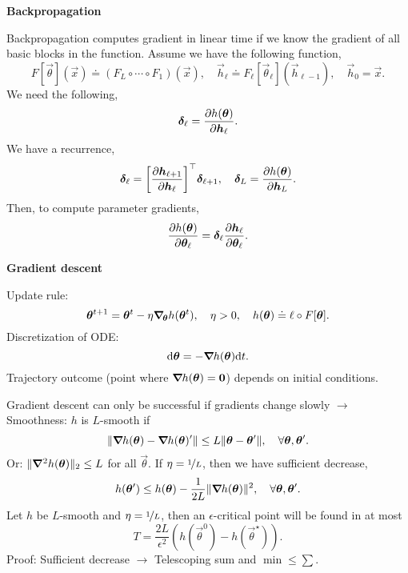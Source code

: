\documentclass[10pt]{article}
\newenvironment{topic}[1]
{\textbf{\sffamily \colorbox{black}{\rlap{\textbf{\textcolor{white}{#1}}}\hspace{\linewidth}\hspace{-2\fboxsep}}}}
{}
\newenvironment{subtopic}[1]
{\begin{center}\textbf{\sffamily #1}\end{center}}
{}
\begin{document}
\begin{multicols*}{3}
\begin{topic}{Feedforward networks}
    \end{topic}

    \begin{topic}{Gradient-based learning}

        \begin{subtopic}{Backpropagation}
            Backpropagation computes gradient in linear time if we know the gradient of all basic
            blocks in the function. Assume we have the following function, \[
                F[\vec{\theta}](\vec{x}) \doteq (F_L \circ \cdots \circ F_1)(\vec{x}), \quad \vec{h}_{\ell} \doteq F_{\ell}[\vec{\theta}_{\ell}](\vec{h}_{\ell-1}), \quad \vec{h}_0 = \vec{x}.
            \]
            We need the following, \[
                \bm{\delta}_{\ell} = \pdv{h(\bm{\theta})}{\bm{h}_{\ell}}.
            \]
            We have a recurrence, \[
                \vec{\delta}_{\ell} = \transpose{\lft[ \pdv{\vec{h}_{\ell+1}}{\vec{h}_{\ell}} \rgt]} \vec{\delta}_{\ell+1}, \quad \vec{\delta}_L = \pdv{h(\vec{\theta})}{\vec{h}_L}.
            \]
            Then, to compute parameter gradients, \[
                \pdv{h(\bm{\theta})}{\bm{\theta}_{\ell}} = \bm{\delta}_{\ell} \pdv{\bm{h}_{\ell}}{\bm{\theta}_{\ell}}.
            \]
        \end{subtopic}

        \begin{subtopic}{Gradient descent}
            Update rule: \[
                \bm{\theta}^{t+1} = \bm{\theta}^t - \eta \bm{\nabla}_{\! \bm{\theta}} h(\bm{\theta}^t), \quad \eta > 0, \quad h(\bm{\theta}) \doteq \ell \circ F[\bm{\theta}].
            \]
            Discretization of ODE: \[
                \mathrm{d}\bm{\theta} = -\bm{\nabla}_{\! } h(\bm{\theta}) \mathrm{d}t.
            \]
            Trajectory outcome (point where $\bm{\nabla}_{\! } h(\bm{\theta}) = \bm{0}$) depends on initial
            conditions.

            Gradient descent can only be successful if gradients change slowly $\to$ Smoothness: $h$ is
            $L$-smooth if \[
                \| \bm{\nabla}_{\! } h(\bm{\theta}) - \bm{\nabla}_{\! } h(\bm{\theta})' \| \leq L \| \bm{\theta} - \bm{\theta}' \|, \quad \forall \bm{\theta},\bm{\theta}'.
            \]
            Or: $\| \bm{\nabla}^2_{\! } h(\bm{\theta}) \|_2 \leq L$ for all $\vec{\theta}$. If $\eta = \nicefrac{1}{L}$,
            then we have sufficient decrease, \[
                h(\bm{\theta}') \leq h(\bm{\theta}) - \frac{1}{2L} \| \bm{\nabla}_{\! } h(\bm{\theta}) \|^2, \quad \forall \bm{\theta},\bm{\theta}'.
            \]
            Let $h$ be $L$-smooth and $\eta=\nicefrac{1}{L}$, then an $\epsilon$-critical point will be found
            in at most \[
                T = \frac{2L}{\epsilon^2} (h(\vec{\theta}^0) - h(\vec{\theta}^\star)).
            \]
            Proof: Sufficient decrease $\to$ Telescoping sum and $\min \leq \sum$.


\end{subtopic}
\end{topic}
\end{multicols*}
\end{document}
